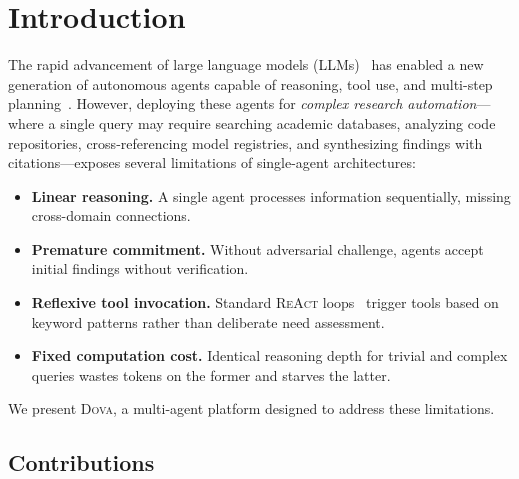 \documentclass{article}
\theoremstyle{plain}
\theoremstyle{definition}
\newcommand{\dova}{\textsc{Dova}}
\newcommand{\react}{\textsc{ReAct}}
\begin{document}
\section{Introduction}\label{sec:intro}

The rapid advancement of large language models
(LLMs)~\citep{brown2020gpt3,anthropic2024claude} has
enabled a new generation of autonomous agents capable of reasoning, tool use,
and multi-step planning~\citep{yao2023react,schick2023toolformer}.  However,
deploying these agents for \emph{complex research automation}---where a single
query may require searching academic databases, analyzing code repositories,
cross-referencing model registries, and synthesizing findings with
citations---exposes several limitations of single-agent architectures:

\begin{itemize}
  \item \textbf{Linear reasoning.}  A single agent processes information
    sequentially, missing cross-domain connections.
  \item \textbf{Premature commitment.}  Without adversarial challenge, agents
    accept initial findings without verification.
  \item \textbf{Reflexive tool invocation.}  Standard \react{}
    loops~\citep{yao2023react} trigger tools based on keyword patterns rather
    than deliberate need assessment.
  \item \textbf{Fixed computation cost.}  Identical reasoning depth for trivial
    and complex queries wastes tokens on the former and starves the latter.
\end{itemize}

We present \dova{}, a multi-agent platform designed to address these
limitations.

\subsection{Contributions}
\end{document}
